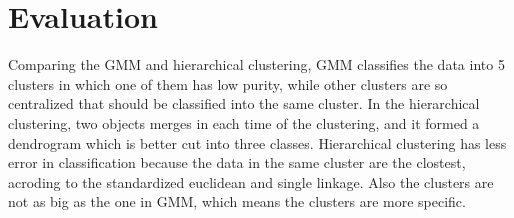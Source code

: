 \section{Evaluation}

Comparing the GMM and hierarchical clustering, GMM classifies the data into 5 clusters in which one of them has low purity, while other clusters are so centralized that should be classified into the same cluster. In the hierarchical clustering, two objects merges in each time of the clustering, and it formed a dendrogram which is better cut into three classes. Hierarchical clustering has less error in classification because the data in the same cluster are the clostest, acroding to the standardized euclidean and single linkage. Also the clusters are not as big as the one in GMM, which means the clusters are more specific. 